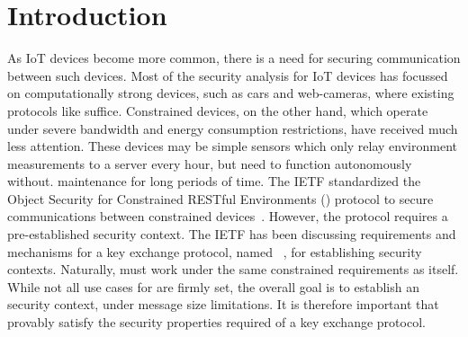 \documentclass[runningheads, envcountsame, hidelinks, a4paper, draft, x11names]{llncs}
\begin{document}
\section{Introduction}
\label{sec:introduction}

As IoT devices become more common, there is a need for securing communication between such devices. 
%
Most of the security analysis for IoT devices has focussed on computationally strong devices, such as cars and web-cameras, where existing protocols like \mDandTls{} suffice.  
%
%
Constrained devices, on the other hand, which operate under severe
bandwidth and energy consumption restrictions, have received much less
attention.
%
These devices may be simple sensors which only relay environment
measurements to a server every hour, but need to function autonomously without. maintenance for long periods of time.
%
%
%
%
The IETF standardized the Object Security for
Constrained RESTful Environments (\mOscore{}) protocol to secure communications between constrained devices~\cite{rfc8613}.
%
However, the \mOscore{} protocol requires a pre-established security context.
%
The IETF has been discussing requirements and mechanisms for a key
exchange protocol, named \mEdhoc~\cite{selander-lake-edhoc-01}, for
establishing \mOscore{} security contexts.
%
Naturally, \mEdhoc{} must work under the same constrained requirements as \mOscore{} itself.
%
While not all use cases for \mEdhoc{} are firmly set, the overall goal is to
establish an \mOscore{} security context, under message size limitations.
%
It is therefore important that \mEdhoc{} provably satisfy the security properties required of a key exchange protocol.
%
\end{document}

